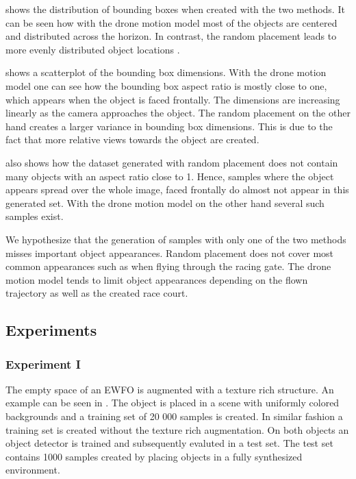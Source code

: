  shows the distribution of bounding boxes when created with the two methods. It can be seen how with the drone motion model most of the objects are centered and distributed across the horizon. In contrast, the random placement leads to more evenly distributed object locations .

 shows a scatterplot of the bounding box dimensions. With the drone motion model one can see how the bounding box aspect ratio is mostly close to one, which appears when the object is faced frontally. The dimensions are increasing linearly as the camera approaches the object. The random placement on the other hand creates a larger variance in bounding box dimensions. This is due to the fact that more relative views towards the object are created. 

 also shows how the dataset generated with random placement does not contain many objects with an aspect ratio close to 1. Hence, samples where the object appears spread over the whole image, faced frontally do almost not appear in this generated set. With the drone motion model on the other hand several such samples exist.

We hypothesize that the generation of samples with only one of the two methods misses important object appearances. Random placement does not cover most common appearances such as when flying through the racing gate. The drone motion model tends to limit object appearances depending on the flown trajectory as well as the created race court.

\subsection{Experiments}

\subsubsection{Experiment I}
The empty space of an \ac{EWFO} is augmented with a texture rich structure. An example can be seen in . The object is placed in a scene with uniformly colored backgrounds and a training set of 20 000 samples is created. In similar fashion a training set is created without the texture rich augmentation. On both objects an object detector is trained and subsequently evaluted in a test set. The test set contains 1000 samples created by placing objects in a fully synthesized environment.


